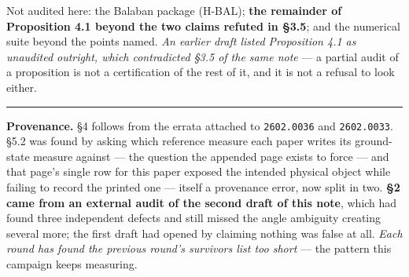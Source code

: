 \documentclass[11pt]{article}
\begin{document}
Not audited here: the Balaban package (H-BAL); \textbf{the remainder of Proposition 4.1
beyond the two claims refuted in \S3.5}; and the numerical suite beyond the points
named. \emph{An earlier draft listed Proposition 4.1 as unaudited outright, which
contradicted \S3.5 of the same note} --- a partial audit of a proposition is not a
certification of the rest of it, and it is not a refusal to look either.

\vspace{3pt}
\noindent\rule{\textwidth}{0.8pt}

\noindent\footnotesize
\textbf{Provenance.} \S4 follows from the errata attached to \texttt{2602.0036} and
\texttt{2602.0033}. \S5.2 was found by asking which reference measure each paper writes
its ground-state measure against --- the question the appended page exists to force ---
and that page's single row for this paper exposed the intended physical object while
failing to record the printed one --- itself a provenance error, now split in two.
\textbf{\S2 came from an external audit of the second draft of this note}, which had
found three independent defects and still missed the angle ambiguity creating several
more; the first draft had opened by claiming nothing was false at all. \emph{Each round
has found the previous round's survivors list too short} --- the pattern this campaign
keeps measuring.
\end{document}
